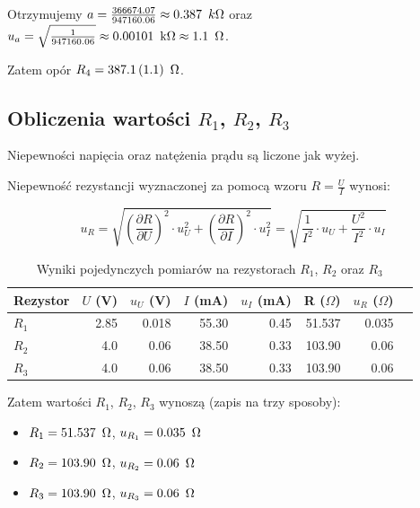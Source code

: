 \documentclass[a4paper]{article}
\begin{document}
Otrzymujemy $a = \frac{366674.07}{947160.06} \approx 0.387 \enskip k\Omega$ oraz $u_a = \sqrt{\frac{1}{947160.06}} \approx 0.00101 \enskip \text{k}\Omega \approx 1.1 \enskip \Omega$.

Zatem opór $R_4 = 387.1 \, (1.1) \enskip \Omega$.

\subsection{Obliczenia wartości $R_1$, $R_2$, $R_3$}

Niepewności napięcia oraz natężenia prądu są liczone jak wyżej.

Niepewność rezystancji wyznaczonej za pomocą wzoru $R = \frac{U}{I}$ wynosi:

$$u_R = \sqrt{(\frac{\partial R}{\partial U})^2 \cdot u_U^2 + (\frac{\partial R}{\partial I})^2 \cdot u_I^2} = \sqrt{\frac{1}{I^2} \cdot u_U + \frac{U^2}{I^2} \cdot u_I}$$

\begin{table}
\centering
\begin{tabular}{lrrrrrrl}
\toprule
Rezystor &  $U$ (V) &  $u_U$ (V) &  $I$ (mA) &  $u_I$ (mA) &  R ($\Omega$) &  $u_R$ ($\Omega$) \\
\midrule
$R_1$ &          2.85 &           0.018 &                  55.30 &              0.45 &             51.537 &             0.035 \\
$R_2$ &          4.0 &           0.06 &                  38.50 &              0.33 &            103.90 &             0.06 \\
$R_3$ &          4.0 &           0.06 &                  38.50 &              0.33 &            103.90 &             0.06 \\
\bottomrule
\end{tabular}
\caption{Wyniki pojedynczych pomiarów na rezystorach $R_1$, $R_2$ oraz $R_3$}
\end{table}

Zatem wartości $R_1$, $R_2$, $R_3$ wynoszą (zapis na trzy sposoby):

\begin{itemize}
\item $R_1 = 51.537 \enskip \Omega$, $u_{R_1} = 0.035 \enskip \Omega$
\item $R_2 = 103.90 \enskip \Omega$, $u_{R_2} = 0.06 \enskip \Omega$
\item $R_3 = 103.90 \enskip \Omega$, $u_{R_3} = 0.06 \enskip \Omega$
\end{itemize}
\end{document}
